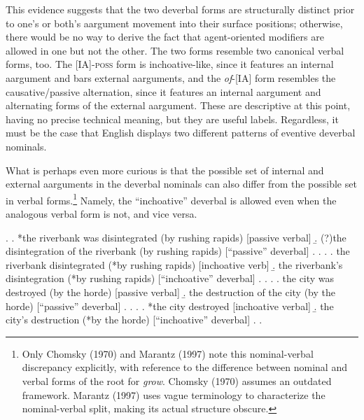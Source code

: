 \documentclass[12pt]{article}
\begin{document}

\par


\doublespacing


This evidence suggests that the two deverbal forms are structurally distinct prior to one's or both's aargument movement into their surface positions; otherwise, there would be no way to derive the fact that agent-oriented modifiers are allowed in one but not the other. The two forms resemble two canonical verbal forms, too. The [IA]-\textsc{poss} form is inchoative-like, since it features an internal aargument and bars external aarguments, and the \textit{of}-[IA] form resembles the causative/passive alternation, since it features an internal aargument and alternating forms of the external aargument. These are descriptive at this point, having no precise technical meaning, but they are useful labels. Regardless, it must be the case that English displays two different patterns of eventive deverbal nominals.

What is perhaps even more curious is that the possible set of internal and external aarguments in the deverbal nominals can also differ from the possible set in verbal forms.\footnote{ Only Chomsky (1970) and Marantz (1997) note this nominal-verbal discrepancy explicitly, with reference to the difference between nominal and verbal forms of the root for \textit{grow}. Chomsky (1970) assumes an outdated framework. Marantz (1997) uses vague terminology to characterize the nominal-verbal split, making its actual structure obscure. } Namely, the ``inchoative'' deverbal is allowed even when the analogous verbal form is not, and vice versa. 

\singlespacing

\ex. 
\a. *the riverbank was disintegrated (by rushing rapids) \hfill [passive verbal]
\b. (?)the disintegration of the riverbank (by rushing rapids) \hfill [``passive'' deverbal]
\z. \z. 
\ex. 
\a. the riverbank disintegrated (*by rushing rapids) \hfill [inchoative verb]
\b. the riverbank's disintegration (*by rushing rapids) \hfill [``inchoative'' deverbal]
\z. \z. 
\ex. 
\a. the city was destroyed (by the horde) \hfill [passive verbal]
\b. the destruction of the city (by the horde) \hfill [``passive'' deverbal]
\z. \z.
\ex. 
\a. *the city destroyed \hfill [inchoative verbal]
\b. the city's destruction (*by the horde) \hfill [``inchoative'' deverbal]
\z. \z. \par \par
\end{document}
